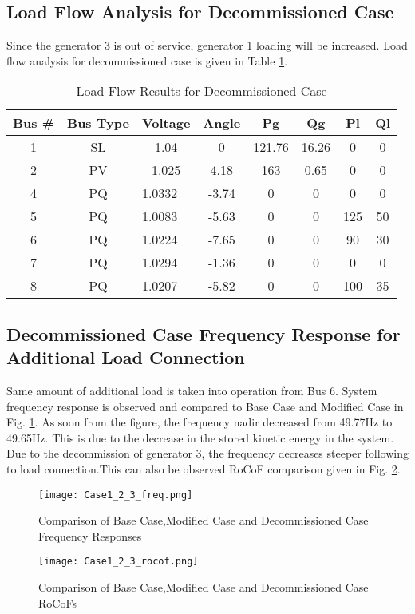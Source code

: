 \subsection{Load Flow Analysis for Decommissioned Case}
Since the generator 3 is out of service, generator 1 loading will be increased. Load flow analysis for decommissioned case is given in Table \ref{loadflow_case3}.
\begin{table}[h!]
	\centering
	\begin{tabular}{cclccccc}
		\hline
		Bus \# & Bus Type & \multicolumn{1}{c}{Voltage} & Angle & Pg    & Qg     & Pl  & Ql \\ \hline
		1      & SL       & \multicolumn{1}{c}{1.04}    & 0     & 121.76& 16.26  & 0   & 0  \\
		2      & PV       & \multicolumn{1}{c}{1.025}   & 4.18  & 163   & 0.65   & 0   & 0  \\
		4      & PQ       & 1.0332                      & -3.74 & 0     & 0      & 0   & 0  \\
		5      & PQ       & 1.0083                      & -5.63 & 0     & 0      & 125 & 50 \\
		6      & PQ       & 1.0224                      & -7.65 & 0     & 0      & 90  & 30 \\
		7      & PQ       & 1.0294                      & -1.36 & 0     & 0      & 0   & 0  \\
		8      & PQ       & 1.0207                      & -5.82 & 0     & 0      & 100 & 35 \\
 \hline
	\end{tabular}
	\caption{Load Flow Results for Decommissioned Case}
	\label{loadflow_case3}
\end{table}
\subsection{Decommissioned Case Frequency Response for Additional Load Connection}
Same amount of additional load is taken into operation from Bus 6. System frequency response is observed and compared to Base Case and Modified Case in Fig. \ref{Case1_2_3_freq}. As soon from the figure, the frequency nadir decreased from 49.77Hz to 49.65Hz. This is due to the decrease in the stored kinetic energy in the system. Due to the decommission of generator 3, the frequency decreases steeper following to load connection.This can also be observed RoCoF comparison given in Fig. \ref{Case1_2_3_rocof}. 
\begin{figure}[h!]
	\centering
	\texttt{[image: Case1\_2\_3\_freq.png]}
	\caption{Comparison of Base Case,Modified Case and Decommissioned Case Frequency Responses}
	\label{Case1_2_3_freq}
\end{figure}
\begin{figure}[h!]
	\centering
	\texttt{[image: Case1\_2\_3\_rocof.png]}
	\caption{Comparison of Base Case,Modified Case and Decommissioned Case RoCoFs}
	\label{Case1_2_3_rocof}
\end{figure}
